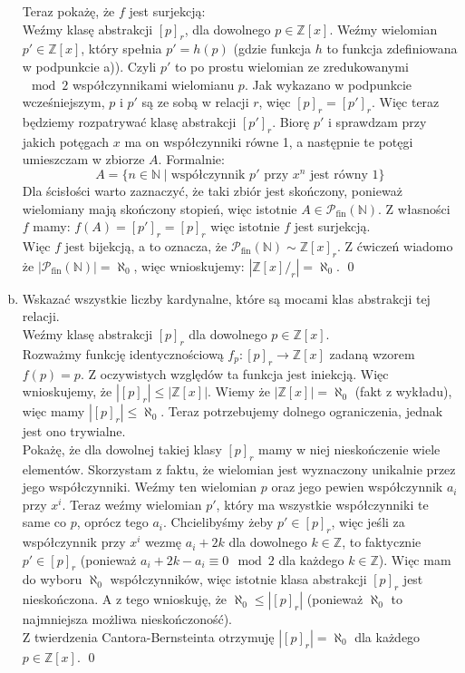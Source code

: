 \documentclass[10pt]{article}
\newcommand{\N}{\mathbb{N}}
\newcommand{\Z}{\mathbb{Z}}
\newcommand{\Pows}{\mathcal{P}}
\begin{document}
\begin{enumerate}[a)]
    Teraz pokażę, że $f$ jest surjekcją: \\[5pt]
    Weźmy klasę abstrakcji $[p]_r$, dla dowolnego $p \in \Z[x]$. Weźmy wielomian $p' \in \Z[x]$, który spełnia $p' = h(p)$ (gdzie funkcja $h$ to funkcja zdefiniowana w podpunkcie a)). Czyli $p'$ to po prostu wielomian ze zredukowanymi $\mod 2$ współczynnikami wielomianu $p$. Jak wykazano w podpunkcie wcześniejszym, $p$ i $p'$ są ze sobą w relacji $r$, więc $[p]_r = [p']_r$. Więc teraz będziemy rozpatrywać klasę abstrakcji $[p']_r$. Biorę $p'$ i sprawdzam przy jakich potęgach $x$ ma on współczynniki równe 1, a następnie te potęgi umieszczam w zbiorze $A$. Formalnie:
    $$A = \{ n \in \N \mid \text{współczynnik $p'$ przy $x^n$ jest równy 1} \}$$
    Dla ścisłości warto zaznaczyć, że taki zbiór jest skończony, ponieważ wielomiany mają skończony stopień, więc istotnie $A \in \Pows_{\text{fin}}(\N)$. Z własności $f$ mamy: $f(A) = [p']_r = [p]_r$ więc istotnie $f$ jest surjekcją. \\[10pt]
    Więc $f$ jest bijekcją, a to oznacza, że $\Pows_{\text{fin}} (\N) \sim \Z[x]_r$. Z ćwiczeń wiadomo że $|\Pows_{\text{fin}} (\N)| = \aleph_0$, więc wnioskujemy: $|\Z[x]/_r| = \aleph_0$. \qed
    \vspace{10pt}
    
    \item Wskazać wszystkie liczby kardynalne, które są mocami klas abstrakcji tej relacji. \\[10pt]
    Weźmy klasę abstrakcji $[p]_r$ dla dowolnego $p \in \Z[x]$.\\[5pt] Rozważmy funkcję identycznościową $f_p \colon [p]_r \to \Z[x]$ zadaną wzorem $f(p) = p$. Z oczywistych względów ta funkcja jest iniekcją. Więc wnioskujemy, że $|[p]_r| \leq |\Z[x]|$. Wiemy że $|\Z[x]| = \aleph_0$ (fakt z wykładu), więc mamy $|[p]_r| \leq \aleph_0$. Teraz potrzebujemy dolnego ograniczenia, jednak jest ono trywialne.\\[5pt]
    Pokażę, że dla dowolnej takiej klasy $[p]_r$ mamy w niej nieskończenie wiele elementów. Skorzystam z faktu, że wielomian jest wyznaczony unikalnie przez jego współczynniki. Weźmy ten wielomian $p$ oraz jego pewien współczynnik $a_i$ przy $x^i$. Teraz weźmy wielomian $p'$, który ma wszystkie współczynniki te same co $p$, oprócz tego $a_i$. Chcielibyśmy żeby $p' \in [p]_r$, więc jeśli za współczynnik przy $x^i$ wezmę $a_i + 2k$ dla dowolnego $k \in \Z$, to faktycznie $p' \in [p]_r$ (ponieważ $a_i + 2k - a_i \equiv 0 \mod 2$ dla każdego $k \in \Z$). Więc mam do wyboru $\aleph_0$ współczynników, więc istotnie klasa abstrakcji $[p]_r$ jest nieskończona. A z tego wnioskuję, że $\aleph_0 \leq |[p]_r|$ (ponieważ $\aleph_0$ to najmniejsza możliwa nieskończoność).\\[5pt]
    Z twierdzenia Cantora-Bernsteinta otrzymuję $|[p]_r| = \aleph_0$ dla każdego $p \in \Z[x]$. \qed
    
\end{enumerate}
\end{document}
